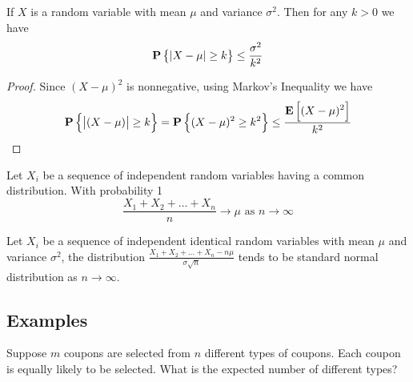 \begin{theorem}
    If $X$ is a random variable with mean $\mu$ and variance $\sigma^2$. Then for any $k > 0$ we have
    \begin{equation}
        \mathop{\bf P\/}\displaystyle \left\{\displaystyle \left\lvert X - \mu \right\rvert \geq k \right\} \leq \frac{\sigma^2}{k^2}
    \end{equation}
\end{theorem}
\begin{proof}
    Since $(X - \mu)^2$ is nonnegative, using Markov's Inequality we have
    \begin{equation*}
        \mathop{\bf P\/}\displaystyle \left\{\displaystyle \left\lvert (X - \mu) \right\rvert \geq k\right\} = \mathop{\bf P\/}\displaystyle \left\{(X - \mu)^2 \geq k^2\right\} \leq \frac{\mathop{\bf E\/}\displaystyle \left[ (X-\mu)^2 \right]}{k^2}
    \end{equation*}
\end{proof}

\begin{theorem}
    Let $X_i$ be a sequence of independent random variables having a common distribution. With probability 1
    \begin{equation}
        \frac{X_1 + X_2 + \dots + X_n}{n} \rightarrow \mu \text{ as } n \rightarrow \infty
    \end{equation}
\end{theorem}

\begin{theorem}
    Let $X_i$ be a sequence of independent identical random variables with mean $\mu$ and variance $\sigma^2$, the distribution $\displaystyle \frac{X_1 + X_2 + \dots + X_n - n \mu}{\sigma \sqrt{n}}$ tends to be standard normal distribution as $n \rightarrow \infty$.
\end{theorem}






\subsection{Examples}

\begin{example}
    Suppose $m$ coupons are selected from $n$ different types of coupons. Each coupon is equally likely to be selected. What is the expected number of different types?
\end{example}

